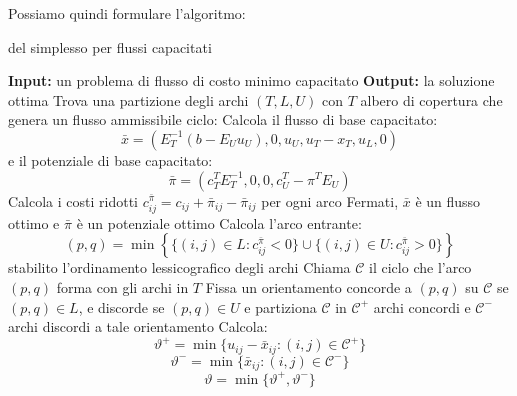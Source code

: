 \documentclass[a4paper,11pt]{article}
\begin{document}
Possiamo quindi formulare l'algoritmo:
\begin{algorithm}[H]
\caption{del simplesso per flussi capacitati}
\begin{algorithmic}
	\STATE \textbf{Input:} un problema di flusso di costo minimo capacitato
	\STATE \textbf{Output:} la soluzione ottima 
	\STATE Trova una partizione degli archi $(T,L,U)$ con $T$ albero di copertura che genera un flusso ammissibile
	\STATE \textsf{ciclo:}
	\STATE Calcola il flusso di base capacitato:
	$$
	\bar{x} = \left(E_T^{-1} (b - E_U u_U), 0, u_U, u_T - x_T, u_L, 0\right) $$
	e il potenziale di base capacitato:
	$$
	\bar{\pi} = \left( c_T^T E_T^{-1}, 0, 0, c_U^T - \pi^T E_U \right)
	$$
	\STATE Calcola i costi ridotti $c_{ij}^{\bar{\pi}} = c_{ij} + \bar{\pi}_{ij} - \bar{\pi}_{ij}$ per ogni arco
	\STATE Fermati, $\bar{x}$ è un flusso ottimo e $\bar{\pi}$ è un potenziale ottimo
\ELSE
		\STATE Calcola l'arco entrante: 
		$$
		(p, q) = \min \left\{ \{ (i, j) \in L : c_{ij}^{\bar{\pi}} < 0 \} \cup \{ (i, j) \in U : c_{ij}^{\bar{\pi}} > 0 \} \right\}
		$$
		stabilito l'ordinamento lessicografico degli archi
		\STATE Chiama $\mathcal{C}$ il ciclo che l'arco $(p, q)$ forma con gli archi in $T$
		\STATE Fissa un orientamento concorde a $(p,q)$ su $\mathcal{C}$ se $(p,q) \in L$, e discorde se $(p,q) \in U$ e partiziona $\mathcal{C}$ in $\mathcal{C^+}$ archi concordi e $\mathcal{C^-}$ archi discordi a tale orientamento
	\ENDIF
		\STATE Calcola:
		$$
		\vartheta^+ = \min\{ u_{ij} - \bar{x}_{ij} : (i, j) \in \mathcal{C}^+ \}
		$$
		$$
		\vartheta^- = \min\{ \bar{x}_{ij} : (i, j) \in \mathcal{C}^- \}
		$$
		$$
		\vartheta = \min\{\vartheta^+, \vartheta^-\}
		$$

\end{algorithmic}
\end{algorithm}
\end{document}
